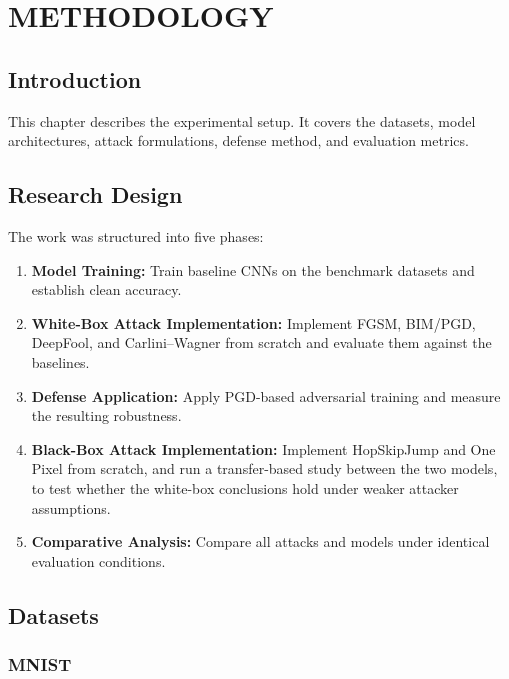 \chapter{METHODOLOGY}
\label{ch:methodology}

\section{Introduction}

This chapter describes the experimental setup. It covers the datasets, model architectures, attack formulations, defense method, and evaluation metrics.

\section{Research Design}

The work was structured into five phases:

\begin{enumerate}
    \item \textbf{Model Training:} Train baseline CNNs on the benchmark datasets and establish clean accuracy.

    \item \textbf{White-Box Attack Implementation:} Implement FGSM, BIM/PGD, DeepFool, and Carlini--Wagner from scratch and evaluate them against the baselines.

    \item \textbf{Defense Application:} Apply PGD-based adversarial training and measure the resulting robustness.

    \item \textbf{Black-Box Attack Implementation:} Implement HopSkipJump and One Pixel from scratch, and run a transfer-based study between the two models, to test whether the white-box conclusions hold under weaker attacker assumptions.

    \item \textbf{Comparative Analysis:} Compare all attacks and models under identical evaluation conditions.
\end{enumerate}

\section{Datasets}

\subsection{MNIST}

